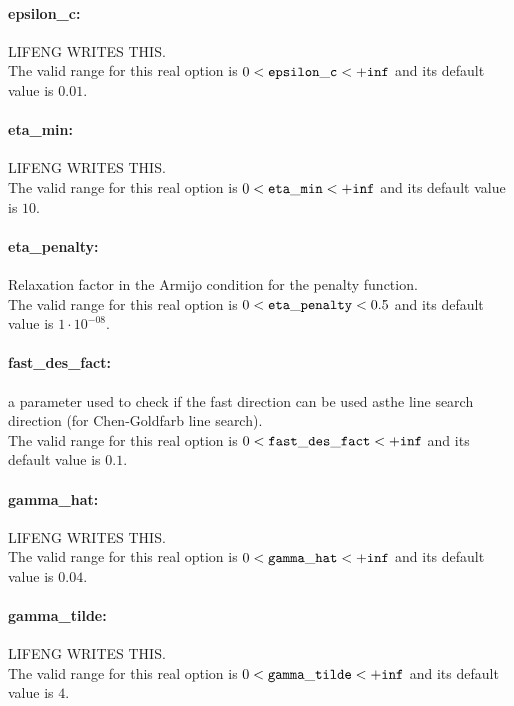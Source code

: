 \paragraph{epsilon\_c:}\label{sec:epsilon_c} LIFENG WRITES THIS. $\;$ \\
 The valid range for this real option is 
$0 <  {\tt epsilon\_c } <  {\tt +inf}$
and its default value is $0.01$.


\paragraph{eta\_min:}\label{sec:eta_min} LIFENG WRITES THIS. $\;$ \\
 The valid range for this real option is 
$0 <  {\tt eta\_min } <  {\tt +inf}$
and its default value is $10$.


\paragraph{eta\_penalty:}\label{sec:eta_penalty} Relaxation factor in the Armijo condition for the penalty function. $\;$ \\
 The valid range for this real option is 
$0 <  {\tt eta\_penalty } <  0.5$
and its default value is $1 \cdot 10^{-08}$.


\paragraph{fast\_des\_fact:}\label{sec:fast_des_fact} a parameter used to check if the fast direction can be used asthe line search direction (for Chen-Goldfarb line search). $\;$ \\
 The valid range for this real option is 
$0 <  {\tt fast\_des\_fact } <  {\tt +inf}$
and its default value is $0.1$.


\paragraph{gamma\_hat:}\label{sec:gamma_hat} LIFENG WRITES THIS. $\;$ \\
 The valid range for this real option is 
$0 <  {\tt gamma\_hat } <  {\tt +inf}$
and its default value is $0.04$.


\paragraph{gamma\_tilde:}\label{sec:gamma_tilde} LIFENG WRITES THIS. $\;$ \\
 The valid range for this real option is 
$0 <  {\tt gamma\_tilde } <  {\tt +inf}$
and its default value is $4$.


